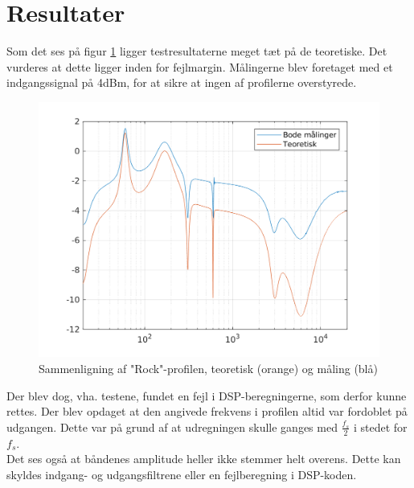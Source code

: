 \section{Resultater}
Som det ses på figur \ref{fig:rock_test} ligger testresultaterne meget tæt på de teoretiske. Det vurderes at dette ligger inden for fejlmargin. Målingerne blev foretaget med et indgangssignal på 4dBm, for at sikre at ingen af profilerne overstyrede.


\begin{figure}[h!]
	\centering
	\includegraphics[width=15cm]{billeder/rock_test}
	\caption{Sammenligning af "Rock"-profilen, teoretisk (orange) og måling (blå)}
	\label{fig:rock_test}
\end{figure}
	

Der blev dog, vha. testene, fundet en fejl i DSP-beregningerne, som derfor kunne rettes. Der blev opdaget at den angivede frekvens i profilen altid var fordoblet på udgangen. Dette var på grund af at udregningen skulle ganges med $\frac{f_s}{2}$ i stedet for $f_s$. \\ 

Det ses også at båndenes amplitude heller ikke stemmer helt overens. Dette kan skyldes indgang- og udgangsfiltrene eller en fejlberegning i DSP-koden. 



